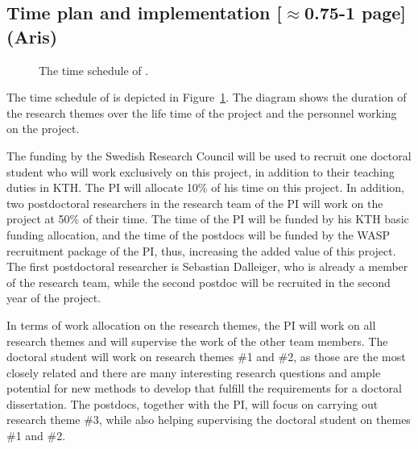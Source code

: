 \documentclass[a4paper,11pt]{article}
\begin{document}
\subsection{Time plan and implementation {\color{orange}[$\approx$0.75-1 page]} {\color{teal}(Aris)}}


\begin{figure}[t]
\begin{center}
\vspace{-2mm}
{\small}
\end{center}
\vspace{-6mm}
\caption{\label{figure:gantt}The time schedule of {\acronym}.}
\vspace{-2mm}
\end{figure}

The time schedule of \acronym is depicted in Figure~\ref{figure:gantt}. 
The diagram shows the duration of the research themes over the life time of the project
and the personnel working on the project.

The funding by the Swedish Research Council will be used to recruit 
one doctoral student who will work exclusively on this project, 
in addition to their teaching duties in KTH.
The PI will allocate 10\% of his time on this project. 
In addition, two postdoctoral researchers in the research team of the PI
will work on the project at 50\% of their time. 
The time of the PI will be funded by his KTH basic funding allocation, 
and the time of the postdocs will be funded by the WASP recruitment package of the PI, 
thus, increasing the added value of this project.
The first postdoctoral researcher is Sebastian Dalleiger, 
who is already a member of the research team, 
while the second postdoc will be recruited in the second year of the project.

In terms of work allocation on the research themes, 
the PI will work on all research themes and will supervise the work of the other team members. 
The doctoral student will work on research themes \#1 and \#2, 
as those are the most closely related and there are many interesting research questions
and ample potential for new methods to develop that fulfill the requirements for a doctoral dissertation. 
The postdocs, together with the PI, will focus on carrying out research theme \#3,
while also helping supervising the doctoral student on themes \#1 and \#2.
\end{document}
